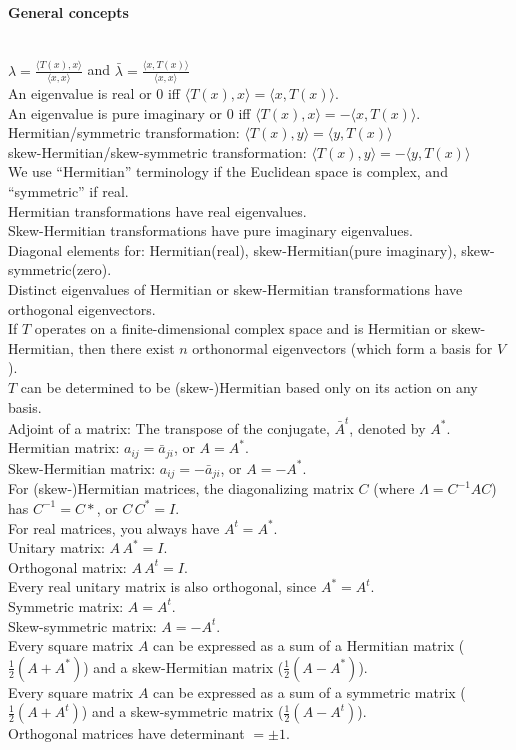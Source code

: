 \documentclass[10pt]{article}
\begin{document}
\paragraph{General concepts}\ \\
$\lambda = \frac{\langle T(x), x \rangle}{\langle x, x \rangle}$ \hskip 5pt and \hskip 5pt 
$\bar{\lambda} = \frac{\langle x, T(x) \rangle}{\langle x, x \rangle}$\\
An eigenvalue is real or 0 iff $\langle T(x), x \rangle = \langle x, T(x) \rangle$.\\
An eigenvalue is pure imaginary or 0 iff $\langle T(x), x \rangle = - \langle x, T(x) \rangle$.\\
Hermitian/symmetric transformation: $\langle T(x), y \rangle = \langle y, T(x) \rangle$\\
skew-Hermitian/skew-symmetric transformation: $\langle T(x), y \rangle = - \langle y, T(x) \rangle$\\
We use ``Hermitian'' terminology if the Euclidean space is complex, and ``symmetric'' if real.\\
Hermitian transformations have real eigenvalues.\\
Skew-Hermitian transformations have pure imaginary eigenvalues.\\
Diagonal elements for: Hermitian(real), skew-Hermitian(pure imaginary), skew-symmetric(zero).\\
Distinct eigenvalues of Hermitian or skew-Hermitian transformations have orthogonal eigenvectors.\\
If $T$ operates on a finite-dimensional complex space and is Hermitian or skew-Hermitian, then
there exist $n$ orthonormal eigenvectors (which form a basis for $V$).\\
$T$ can be determined to be (skew-)Hermitian based only on its action on any basis.\\
Adjoint of a matrix: The transpose of the conjugate, $\bar{A}^t$, denoted by $A^*$.
Hermitian matrix: $a_{ij} = \bar{a}_{ji}$, or $A = A^*$.\\
Skew-Hermitian matrix: $a_{ij} = - \bar{a}_{ji}$, or $A = - A^*$.\\
For (skew-)Hermitian matrices, the diagonalizing matrix $C$ (where $\Lambda = C^{-1}AC$) has $C^{-1} = C*$, or $C\, C^* = I$.\\
For real matrices, you always have $A^t = A^*$.\\
Unitary matrix: $A\, A^* = I$.\\
Orthogonal matrix: $A\, A^t = I$.\\
Every real unitary matrix is also orthogonal, since $A^* = A^t$.\\
Symmetric matrix: $A = A^t$.\\
Skew-symmetric matrix: $A = - A^t$.\\
Every square matrix $A$ can be expressed as a sum of a Hermitian matrix ($\frac{1}{2}(A + A^*)$)
and a skew-Hermitian matrix ($\frac{1}{2}(A - A^*)$).\\
Every square matrix $A$ can be expressed as a sum of a symmetric matrix ($\frac{1}{2}(A + A^t)$)
and a skew-symmetric matrix ($\frac{1}{2}(A - A^t)$).\\
Orthogonal matrices have determinant $= \pm 1$.
\end{document}
